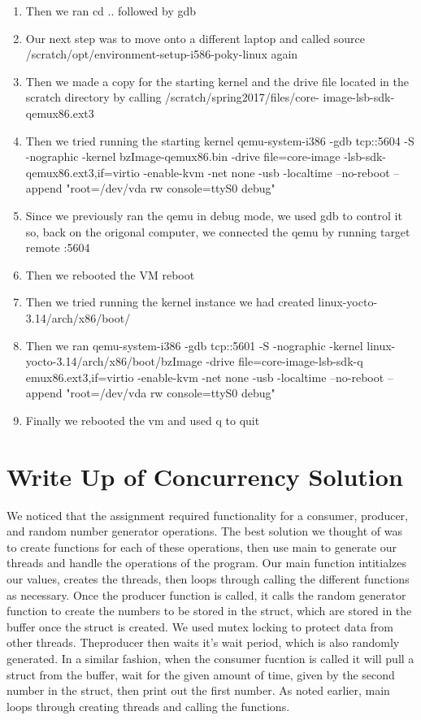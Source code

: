 \begin{enumerate}
 \item Then we ran \textcolor{povcodered}{cd ..} followed by \textcolor{povcodered}{gdb}
 \item Our next step was to move onto a different laptop and called \textcolor{povcodered}{source /scratch/opt/environment-setup-i586-poky-linux } again
 \item Then we made a copy for the starting kernel and the drive file located in the scratch directory by calling \textcolor{povcodered}{/scratch/spring2017/files/core-    image-lsb-sdk-qemux86.ext3}
 \item Then we tried running the starting kernel \textcolor{povcodered}{qemu-system-i386 -gdb tcp::5604 -S -nographic -kernel bzImage-qemux86.bin -drive file=core-image    -lsb-sdk-qemux86.ext3,if=virtio -enable-kvm -net none -usb -localtime --no-reboot --append "root=/dev/vda rw console=ttyS0 debug"}
 \item Since we previously ran the qemu in debug mode, we used gdb to control it so, back on the origonal computer, we connected the qemu by running \textcolor{povcodered}{target remote :5604}
 \item Then we rebooted the VM \textcolor{povcodered}{reboot}
 \item Then we tried running the kernel instance we had created \textcolor{povcodered}{linux-yocto-3.14/arch/x86/boot/}
 \item Then we ran \textcolor{povcodered}{qemu-system-i386 -gdb tcp::5601 -S -nographic -kernel linux-yocto-3.14/arch/x86/boot/bzImage  -drive file=core-image-lsb-sdk-q    emux86.ext3,if=virtio -enable-kvm -net none -usb -localtime --no-reboot --append "root=/dev/vda rw console=ttyS0 debug"}
 \item Finally we rebooted the vm and used \textcolor{povcodered}{q} to quit
\end{enumerate}

\section{Write Up of Concurrency Solution}
We noticed that the assignment required functionality for a consumer, producer, and random number generator operations. The best solution we thought of was to create functions for each of these operations, then use main to generate our threads and handle the operations of the program. Our main function intitialzes our values, creates the threads, then loops through calling the different functions as necessary. Once the producer function is called, it calls the random generator function to create the numbers to be stored in the struct, which are stored in the buffer once the struct is created. We used mutex locking to protect data from other threads. Theproducer then waits it's wait period, which is also randomly generated. In a similar fashion, when the consumer fucntion is called it will pull a struct from the buffer, wait for the given amount of time, given by the second number in the struct, then print out the first number. As noted earlier, main loops through creating threads and calling the functions. 

